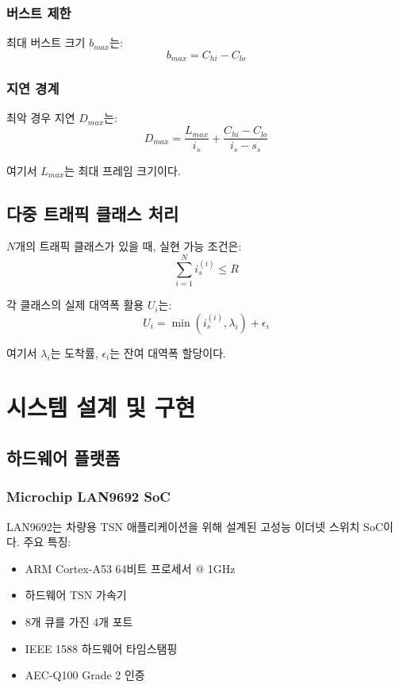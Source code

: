 \documentclass[10pt,twocolumn]{IEEEtran}
\begin{document}
\subsubsection{버스트 제한}
최대 버스트 크기 $b_{max}$는:
\begin{equation}
b_{max} = C_{hi} - C_{lo}
\end{equation}

\subsubsection{지연 경계}
최악 경우 지연 $D_{max}$는:
\begin{equation}
D_{max} = \frac{L_{max}}{i_s} + \frac{C_{hi} - C_{lo}}{i_s - s_s}
\end{equation}

여기서 $L_{max}$는 최대 프레임 크기이다.

\subsection{다중 트래픽 클래스 처리}

$N$개의 트래픽 클래스가 있을 때, 실현 가능 조건은:
\begin{equation}
\sum_{i=1}^{N} i_s^{(i)} \leq R
\end{equation}

각 클래스의 실제 대역폭 활용 $U_i$는:
\begin{equation}
U_i = \min\left(i_s^{(i)}, \lambda_i\right) + \epsilon_i
\end{equation}

여기서 $\lambda_i$는 도착률, $\epsilon_i$는 잔여 대역폭 할당이다.

\section{시스템 설계 및 구현}

\subsection{하드웨어 플랫폼}

\subsubsection{Microchip LAN9692 SoC}
LAN9692는 차량용 TSN 애플리케이션을 위해 설계된 고성능 이더넷 스위치 SoC이다. 주요 특징:

\begin{itemize}
\item ARM Cortex-A53 64비트 프로세서 @ 1GHz
\item 하드웨어 TSN 가속기
\item 8개 큐를 가진 4개 포트
\item IEEE 1588 하드웨어 타임스탬핑
\item AEC-Q100 Grade 2 인증
\end{itemize}
\end{document}
